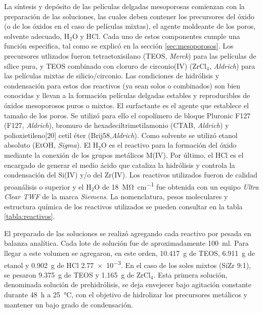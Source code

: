 			La síntesis y depósito de las películas delgadas mesoporosas comienzan con la preparación de las soluciones, las cuales deben contener los precursores del óxido (o de los óxidos en el caso de películas mixtas), el agente moldeante de los poros, solvente adecuado, H$_2$O y HCl\cite{Brinker1990}. Cada uno de estos componentes cumple una función especifica, tal como se explicó en la sección \ref{sec:mesoporosos}. Los precursores utlizados fueron tetraetoxisilano (TEOS, \textit{Merck}) para las películas de sílice pura, y TEOS combinado con cloruro de circonio(IV) (ZrCl$_4$, \textit{Aldrich}) para las películas mixtas de silicio/circonio. Las condiciones de hidrólisis y condensación para estos dos reactivos (ya sean solos o combinados) son bien conocidas y llevan a la formación películas delgadas estables y reproducibles de óxidos mesoporosos puros o mixtos\cite{Soler-Illia2004,Crepaldi2002a,Angelome2008}. El surfactante es el agente que establece el tamaño de los poros. Se utilizó para ello el copolímero de bloque Pluronic F127 (F127, \textit{Aldrich}), bromuro de hexadeciltrimetilamonio (CTAB, \textit{Aldrich}) y polioxietileno[20] cetil éter (Brij58,\textit{Aldrich}). Como solvente se utilizó etanol absoluto (EtOH, \textit{Sigma}). El H$_2$O es el reactivo para la formación del óxido mediante la conexión de los grupos metálicos M(IV). Por último, el HCl es el encargado de generar el medio ácido que cataliza la hidrólisis y controla la condensación del Si(IV) y/o del Zr(IV). Los reactivos utilizados fueron de calidad proanálisis o superior y el H$_2$O de \SI{18}{\mega\ohm\per\cm} fue obtenida con un equipo \textit{Ultra Clear TWF} de la marca \textit{Siemens}. La nomenclatura, pesos moleculares y estructura química de los reactivos utilizados se pueden consultar en la tabla \ref{tabla:reactivos}.
					
			El preparado de las soluciones se realizó agregando cada reactivo por pesada en balanza analítica. Cada lote de solución fue de aproximadamente \SI{100}{\ml}. Para llegar a este volumen se agregaron, en este orden, \SI{10.417}{\gram} de TEOS, \SI{6.911}{\gram} de etanol y \SI{0.902}{\gram} de HCl \SI{2,77e-3}{\Molar}. En el caso de los soles mixtos (Si\textbar Zr 9:1), se pesaron \SI{9.375}{\gram} de TEOS y \SI{1.165}{\gram} de ZrCl$_4$. Esta primera solución, denominada solución de prehidrólisis, se deja envejecer bajo agitación constante durante \SI{48}{\hour} a \SI{25}{\celsius}, con el objetivo de hidrolizar los precursores metálicos y mantener un bajo grado de condensación.\cite{Grosso2001}

